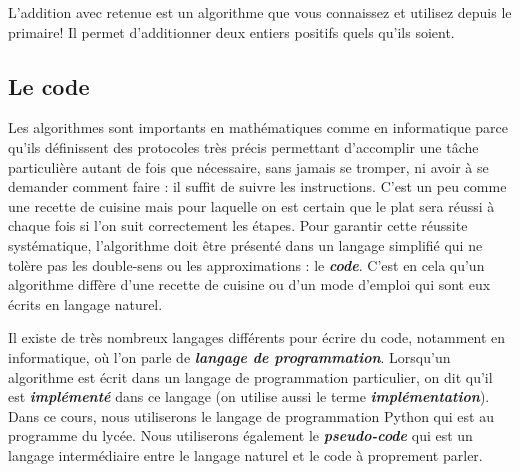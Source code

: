 \begin{example}
	L'addition avec retenue est un algorithme que vous connaissez et utilisez depuis le primaire! Il permet d'additionner deux entiers positifs quels qu'ils soient.
\end{example}

\subsection{Le code}

Les algorithmes sont importants en mathématiques comme en informatique parce qu'ils définissent des protocoles très précis permettant d'accomplir une tâche particulière autant de fois que nécessaire, sans jamais se tromper, ni avoir à se demander comment faire : il suffit de suivre les instructions. C'est un peu comme une recette de cuisine mais pour laquelle on est certain que le plat sera réussi à chaque fois si l'on suit correctement les étapes. Pour garantir cette réussite systématique, l'algorithme doit être présenté dans un langage simplifié qui ne tolère pas les double-sens ou les approximations : le \textit{\textbf{code}}. C'est en cela qu'un algorithme diffère d'une recette de cuisine ou d'un mode d'emploi qui sont eux écrits en langage naturel.

Il existe de très nombreux langages différents pour écrire du code, notamment en informatique, où l'on parle de \textit{\textbf{langage de programmation}}. Lorsqu'un algorithme est écrit dans un langage de programmation particulier, on dit qu'il est \textit{\textbf{implémenté}} dans ce langage (on utilise aussi le terme \textit{\textbf{implémentation}}). Dans ce cours, nous utiliserons le langage de programmation Python qui est au programme du lycée. Nous utiliserons également le \textit{\textbf{pseudo-code}} qui est un langage intermédiaire entre le langage naturel et le code à proprement parler.

